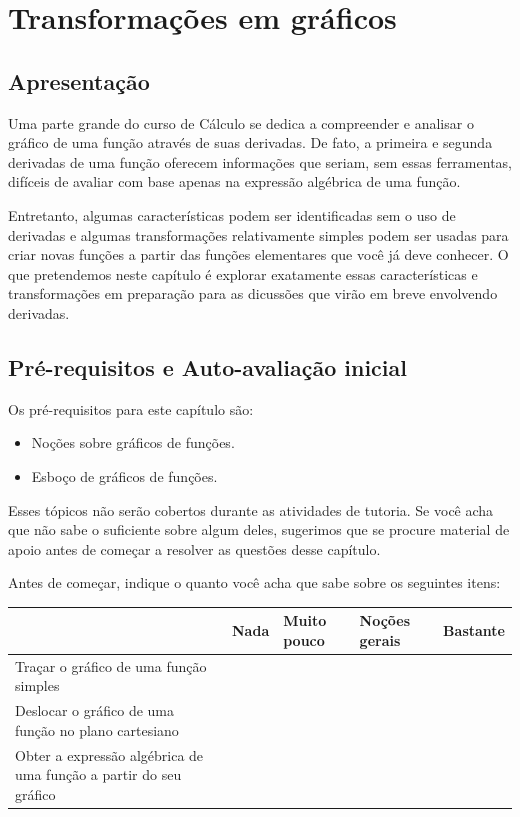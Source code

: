 \documentclass[main_estudante.tex]{subfiles}
\begin{document}
\chapter{Transformações em gráficos}

\section{Apresentação}

Uma parte grande do curso de Cálculo se dedica a compreender e analisar o gráfico de uma função através de suas derivadas. De fato, a primeira e segunda derivadas de uma função oferecem informações que seriam, sem essas ferramentas, difíceis de avaliar com base apenas na expressão algébrica de uma função.

Entretanto, algumas características podem ser identificadas sem o uso de derivadas e algumas transformações relativamente simples podem ser usadas para criar novas funções a partir das funções elementares que você já deve conhecer. O que pretendemos neste capítulo é explorar exatamente essas características e transformações em preparação para as dicussões que virão em breve envolvendo derivadas.

\newpage

\section{Pré-requisitos e Auto-avaliação inicial}

Os pré-requisitos para este capítulo são:
\begin{itemize}
 \item Noções sobre gráficos de funções.
 \item Esboço de gráficos de funções.
\end{itemize}

Esses tópicos não serão cobertos durante as atividades de tutoria. Se você acha que não sabe o suficiente sobre algum deles, sugerimos que se procure material de apoio antes de começar a resolver as questões desse capítulo.

Antes de começar, indique o quanto você acha que sabe sobre os seguintes itens:

\begin{center}
 \begin{tabular}{|p{35mm}||p{15mm}|p{15mm}|p{15mm}|p{15mm}|} 
 \hline
   & Nada & Muito pouco & Noções gerais & Bastante\\
 \hline
 Traçar o gráfico de uma função simples &  &  &  &  \\ 
 \hline
 Deslocar o gráfico de uma função no plano cartesiano &  &  &  &  \\
 \hline
 Obter a expressão algébrica de uma função a partir do seu gráfico &  &  &  &  \\
 \hline
\end{tabular}
\end{center}
\end{document}
